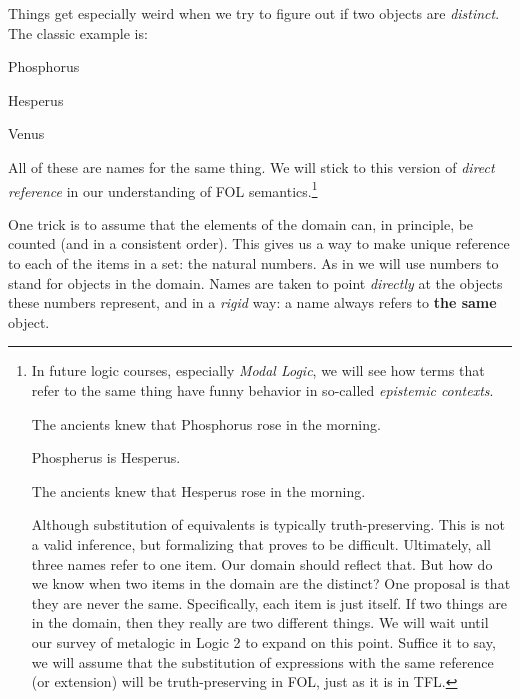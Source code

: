 Things get especially weird when we try to figure out if two objects are
\emph{distinct}. The classic example is:

\begin{argument}
  \item[$p$:] Phosphorus
  \item[$h$:] Hesperus
  \item[$v$:] Venus
\end{argument}

All of these are names for the same thing. We will stick to this version of
\emph{direct reference} in our understanding of FOL semantics.\footnote{

  In future logic courses, especially \emph{Modal Logic}, we will see how terms
  that refer to the same thing have funny behavior in so-called \emph{epistemic
  contexts}.
  
  \begin{argument}
  \item[ ] The ancients knew that Phosphorus rose in the morning.
  \item[ ] Phospherus is Hesperus.
  \item[\therefore] The ancients knew that Hesperus rose in the morning.
  \end{argument}
  
  Although substitution of equivalents is typically truth-preserving. This is
  not a valid inference, but formalizing that proves to be difficult.
  Ultimately, all three names refer to one item. Our domain should reflect that.
  But how do we know when two items in the domain are the distinct? One
  proposal is that they are never the same. Specifically, each item is just
  itself. If two things are in the domain, then they really are two different
  things. We will wait until our survey of metalogic in Logic 2 to expand on
  this point. Suffice it to say, we will assume that the substitution of
  expressions with the same reference (or extension) will be truth-preserving
  in FOL, just as it is in TFL.
  
}

One trick is to assume that the elements of the domain can, in principle, be
counted (and in a consistent order). This gives us a way to make unique
reference to each of the items in a set: the natural numbers. As in
\cite{Mag25} we will use numbers to stand for objects in the domain. Names are
taken to point \emph{directly} at the objects these numbers represent, and in
a \emph{rigid} way: a name always refers to \textbf{the same} object.

